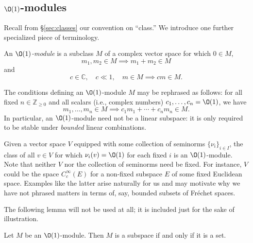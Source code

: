 

\subsection{$\O(1)$-modules}
Recall from \S\ref{sec:classes}  our convention on ``class.''  We introduce one further specialized piece of terminology.
\begin{definition}
  An \emph{$\O(1)$-module} is a subclass $M$ of a complex vector space for which $0 \in M$,
  \[
    m_1, m_2 \in M \implies m_1 + m_2 \in M
  \]
  and
  \[
    c \in \mathbb{C}, \quad c \ll 1, \quad m \in M \implies c m \in M.
  \]
\end{definition}
The conditions defining an $\O(1)$-module $M$ may be rephrased as follows: for all fixed $n \in \mathbb{Z}_{\geq 0}$ and all scalars (i.e., complex numbers) $c_1, \dotsc,c_n = \O(1)$, we have
\begin{equation*}
  m_1,\dotsc,m_n \in M \implies c_1 m_1 + \dotsb + c_n m_n \in M.
\end{equation*}
In particular, an $\O(1)$-module need not be a linear subspace: it is only required to be stable under \emph{bounded} linear combinations.
\begin{example}
  Given a vector space $V$ equipped with some collection of seminorms $\{\nu_i\}_{i \in I}$, the class of all $v \in V$ for which $\nu_i(v) = \O(1)$ for each fixed $i$ is an $\O(1)$-module.  Note that neither $V$ nor the collection of seminorms need be fixed.  For instance, $V$ could be the space $C_c^\infty(E)$ for a non-fixed subspace $E$ of some fixed Euclidean space.  Examples like the latter arise naturally for us and may motivate why we have not phrased matters in terms of, say, bounded subsets of Fréchet spaces.
\end{example}
The following lemma will not be used at all; it is included just for the sake of illustration.
\begin{lemma}
  Let $M$ be an $\O(1)$-module.  Then $M$ is a subspace if and only if it is a set.
\end{lemma}
